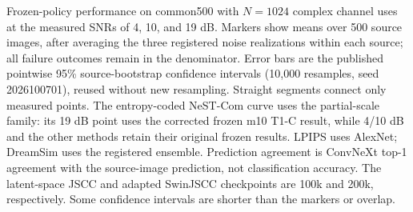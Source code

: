 \caption{Frozen-policy performance on common500 with $N=1024$ complex channel
uses at the measured SNRs of 4, 10, and 19 dB. Markers show means over 500 source
images, after averaging the three registered noise realizations within each
source; all failure outcomes remain in the denominator. Error bars are the
published pointwise 95\% source-bootstrap confidence intervals (10,000 resamples,
seed 2026100701), reused without new resampling. Straight segments connect only
measured points. The entropy-coded NeST-Com curve uses the partial-scale family:
its 19 dB point uses the corrected frozen m10 T1-C result, while 4/10 dB and the
other methods retain their original frozen results. LPIPS uses AlexNet;
DreamSim uses the registered ensemble. Prediction agreement is ConvNeXt top-1
agreement with the source-image prediction, not classification accuracy. The
latent-space JSCC and adapted SwinJSCC checkpoints are 100k and 200k, respectively.
Some confidence intervals are shorter than the markers or overlap.}
\label{fig:main-corrected-common500}
